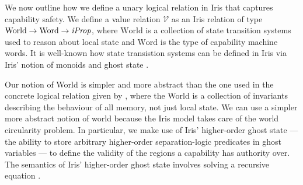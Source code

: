 \documentclass[sigplan,review]{acmart}\settopmatter{printfolios=true,printccs=false,printacmref=false}
\newcommand{\bigsep}{\mathop{\scalebox{2.5}{\raisebox{-0.4ex}{$*$}}}}%
\newcommand{\interp}[2]{(#1)(#2)}
\begin{document}
	



\newcommand{\World}{\mathrm{World}} \newcommand{\Word}{\mathrm{Word}} We now outline how we define a unary logical relation in Iris that captures capability safety.
We define a value relation $\mathcal{V}$ as an Iris relation of type $\World \to \Word \to \emph{iProp}$, where $\World$ is a collection of state transition systems used to reason about local state and
$\Word$ is the type of capability machine words. 
It is well-known how state transistion systems can be defined in Iris via Iris' notion of monoids and ghost state \cite{iris}.

Our notion of World is simpler and more abstract than the 
one used in the concrete logical relation given by \cite{skorstengaardESOP18}, where the World is a collection of invariants describing the behaviour of all memory, not just local state.
We can use a simpler more abstract notion of world because the Iris model takes care of the world circularity problem. In particular, we make use of Iris' higher-order ghost state ---
the ability to store arbitrary higher-order separation-logic predicates in ghost variables ---
to define the validity of the regions a capability has authority over. The semantics of
Iris' higher-order ghost state involves solving a recursive equation \cite{iris2}. 
\end{document}
